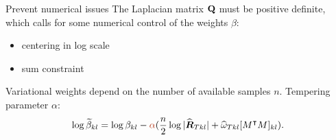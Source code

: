 \documentclass[11pt]{beamer}
\newcommand\Qb{{\bf Q}}
\newcommand{\Rbf}{{\boldsymbol{R}}}
\newcommand{\emphase}[1]{\textcolor{Complement}{#1}}
\begin{document}
  \begin{frame}{Prevent numerical issues}
The Laplacian matrix $\Qb$ must be positive definite, which calls for some numerical control of the weights $\beta$:
\begin{itemize}
\item centering in log scale
\item sum constraint 
\end{itemize}
\bigskip

  Variational weights depend on the number of available samples $n$. Tempering parameter $\alpha$:
   $$\log \widetilde{\beta}_{kl} = \log \beta_{kl} - \emphase{\alpha}(\frac{n}{2}\log|\widehat{\Rbf}_{Tkl}| + \widehat{\omega}_{Tkl} [M^\intercal M]_{kl}).$$
   
  \end{frame}
%
%
%
%
\end{document}
